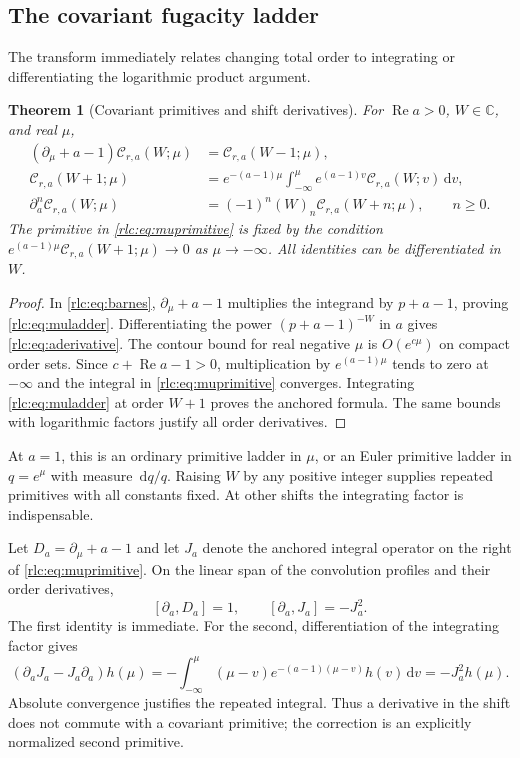 \documentclass[11pt,a4paper]{article}
\numberwithin{equation}{section}
\newtheorem{theorem}{Theorem}[section]
\theoremstyle{definition}\newtheorem{definition}[theorem]{Definition}
\theoremstyle{remark}\newtheorem{remark}[theorem]{Remark}
\DeclareMathOperator{\Rea}{Re}
\newcommand{\dd}{\,\mathrm d}
\newcommand{\C}{\mathbb C}\newcommand{\R}{\mathbb R}\newcommand{\N}{\mathbb N}
\newcommand{\CC}{\mathcal C}
\begin{document}
\subsection{The covariant fugacity ladder}
The transform immediately relates changing total order to integrating
or differentiating the logarithmic product argument.

\begin{theorem}[Covariant primitives and shift derivatives]
\label{rlc:thm:ladder}
For $\Rea a>0$, $W\in\C$, and real $\mu$,
\begin{align}
 (\partial_\mu+a-1)\CC_{r,a}(W;\mu)
      &=\CC_{r,a}(W-1;\mu),\label{rlc:eq:muladder}\\
 \CC_{r,a}(W+1;\mu)
      &=e^{-(a-1)\mu}\int_{-\infty}^{\mu}
              e^{(a-1)v}\CC_{r,a}(W;v)\dd v,
        \label{rlc:eq:muprimitive}\\
 \partial_a^n\CC_{r,a}(W;\mu)
      &=(-1)^n(W)_n\CC_{r,a}(W+n;\mu),\qquad n\ge0.
       \label{rlc:eq:aderivative}
\end{align}
The primitive in \eqref{rlc:eq:muprimitive} is fixed by the condition
$e^{(a-1)\mu}\CC_{r,a}(W+1;\mu)\to0$ as $\mu\to-\infty$.
All identities can be differentiated in $W$.
\end{theorem}
\begin{proof}
In \eqref{rlc:eq:barnes}, $\partial_\mu+a-1$ multiplies the integrand
by $p+a-1$, proving \eqref{rlc:eq:muladder}. Differentiating the power
$(p+a-1)^{-W}$ in $a$ gives \eqref{rlc:eq:aderivative}.
The contour bound for real negative $\mu$ is $O(e^{c\mu})$ on compact
order sets. Since $c+\Rea a-1>0$, multiplication by
$e^{(a-1)\mu}$ tends to zero at $-\infty$ and the integral in
\eqref{rlc:eq:muprimitive} converges. Integrating
\eqref{rlc:eq:muladder} at order $W+1$ proves the anchored formula.
The same bounds with logarithmic factors justify all order derivatives.
\end{proof}

At $a=1$, this is an ordinary primitive ladder in $\mu$, or an Euler
primitive ladder in $q=e^\mu$ with measure $\dd q/q$. Raising $W$ by
any positive integer supplies repeated primitives with all constants
fixed. At other shifts the integrating factor is indispensable.

Let $D_a=\partial_\mu+a-1$ and let $J_a$ denote the anchored integral
operator on the right of \eqref{rlc:eq:muprimitive}. On the linear span
of the convolution profiles and their order derivatives,
\begin{equation}\label{rlc:eq:commutators}
 [\partial_a,D_a]=1,\qquad
 [\partial_a,J_a]=-J_a^2.
\end{equation}
The first identity is immediate. For the second, differentiation of the
integrating factor gives
\[
 (\partial_aJ_a-J_a\partial_a)h(\mu)
   =-\int_{-\infty}^{\mu}(\mu-v)e^{-(a-1)(\mu-v)}h(v)\dd v
   =-J_a^2h(\mu).
\]
Absolute convergence justifies the repeated integral. Thus a derivative
in the shift does not commute with a covariant primitive; the correction
is an explicitly normalized second primitive.
\end{document}
